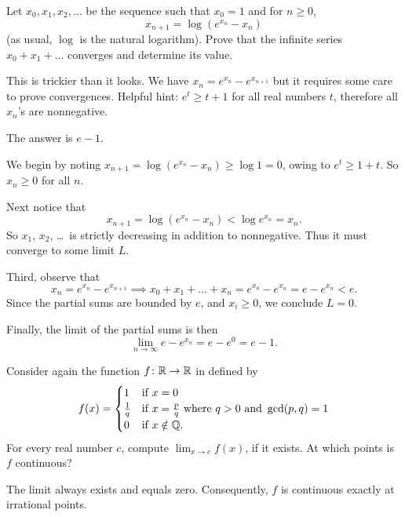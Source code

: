 \begin{problem}
	[Putnam 2016 B1]
	\onechili
	Let $x_0, x_1, x_2, \dots$ be the sequence
	such that $x_0=1$ and for $n\ge 0$,
	\[ x_{n+1} = \log(e^{x_n}-x_n) \]
	(as usual, $\log$ is the natural logarithm).
	Prove that the infinite series $x_0 + x_1 + \dots$
	converges and determine its value.
	\begin{hint}
		This is trickier than it looks.
		We have $x_n = e^{x_n} - e^{x_{n+1}}$
		but it requires some care to prove convergences.
		Helpful hint: $e^t \ge t+1$ for all real numbers $t$,
		therefore all $x_n$'s are nonnegative.
	\end{hint}
	\begin{sol}
		The answer is $e-1$.

		We begin by noting $x_{n+1} = \log(e^{x_n} - x_n) \ge \log 1 = 0$,
		owing to $e^t \ge 1+t$.
		So $x_n \ge 0$ for all $n$.

		Next notice that
		\[ x_{n+1} = \log\left( e^{x_n} - x_n \right) < \log e^{x_n} = x_n. \]
		So $x_1$, $x_2$, \dots\ is strictly decreasing in addition to nonnegative.
		Thus it must converge to some limit $L$.

		Third, observe that
		\[ x_n = e^{x_n} - e^{x_{n+1}}
			\implies x_0 + x_1 + \dots + x_n
			= e^{x_0} - e^{x_n} = e - e^{x_n} < e. \]
		Since the partial sums are bounded by $e$,
		and $x_i \ge 0$, we conclude $L = 0$.

		Finally, the limit of the partial sums is then
		\[ \lim_{n \to \infty} e - e^{x_n} = e - e^0 = e - 1. \]
	\end{sol}
\end{problem}


\begin{problem}
	Consider again the function $f \colon \mathbb R \to \mathbb R$
	in  defined by
	\[ f(x) = \begin{cases}
			1 & \text{if } x = 0 \\
			\frac1q & \text{if } x = \frac pq
			\text{ where } q > 0 \text{ and } \gcd(p,q) = 1 \\
			0 & \text{if } x \notin \mathbb Q.
		\end{cases} \]
	For every real number $c$,
	compute $\lim_{x \to c} f(x)$, if it exists.
	At which points is $f$ continuous?
	\begin{hint}
		The limit always exists and equals zero.
		Consequently, $f$ is continuous exactly at irrational points.
	\end{hint}
\end{problem}
